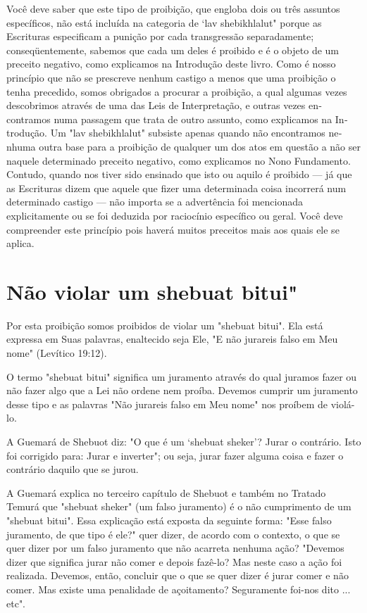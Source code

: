 \begin{itemize}
\begin{enumrate}
\begin{itemize}
\begin{itemize}
\begin{itemize}
Você deve saber que este tipo de proibição, que engloba dois ou três
assuntos específicos, não está incluída na categoria de `lav
shebikhlalut" por­que as Escrituras especificam a punição por cada
transgressão separadamente; conseqüentemente, sabemos que cada um deles
é proibido e é o objeto de um preceito negativo, como explicamos na
Introdução deste livro. Como é nosso princípio que não se prescreve
nenhum castigo a menos que uma proibição o tenha precedido, somos
obrigados a procurar a proibição, a qual algumas ve­zes descobrimos
através de uma das Leis de Interpretação, e outras vezes en­contramos
numa passagem que trata de outro assunto, como explicamos na
In­trodução. Um "lav shebikhlalut" subsiste apenas quando não
encontramos ne­nhuma outra base para a proibição de qualquer um dos atos
em questão a não ser naquele determinado preceito negativo, como
explicamos no Nono Funda­mento. Contudo, quando nos tiver sido ensinado
que isto ou aquilo é proibido --- já que as Escrituras dizem que aquele
que fizer uma determinada coisa incor­rerá num determinado castigo ---
não importa se a advertência foi mencionada explicitamente ou se foi
deduzida por raciocínio específico ou geral. Você de­ve compreender este
princípio pois haverá muitos preceitos mais aos quais ele se aplica.

\section{Não violar um shebuat bitui"}

Por esta proibição somos proibidos de violar um "shebuat bitui". Ela
está expressa em Suas palavras, enaltecido seja Ele, "E não jurareis
falso em Meu nome" (Levítico 19:12).

O termo "shebuat bitui" significa um juramento através do qual ju­ramos
fazer ou não fazer algo que a Lei não ordene nem proíba. Devemos
cum­prir um juramento desse tipo e as palavras "Não jurareis falso em
Meu nome" nos proíbem de violá-lo.

A Guemará de Shebuot diz: "O que é um `shebuat sheker'? Jurar o
contrário. Isto foi corrigido para: Jurar e inverter"; ou seja, jurar
fazer alguma coisa e fazer o contrário daquilo que se jurou.

A Guemará explica no terceiro capítulo de Shebuot e também no Tra­tado
Temurá que "shebuat sheker" (um falso juramento) é o não cumprimento de
um "shebuat bitui". Essa explicação está exposta da seguinte forma:
"Esse falso juramento, de que tipo é ele?" quer dizer, de acordo com o
contexto, o que se quer dizer por um falso juramento que não acarreta
nenhuma ação? "Devemos dizer que significa jurar não comer e depois
fazê-lo? Mas neste caso a ação foi realizada. Devemos, então, concluir
que o que se quer dizer é jurar comer e não comer. Mas existe uma
penalidade de açoitamento? Seguramente foi-nos dito ... etc".



\end{itemize}
\end{itemize}
\end{itemize}
\end{enumrate}
\end{itemize}

